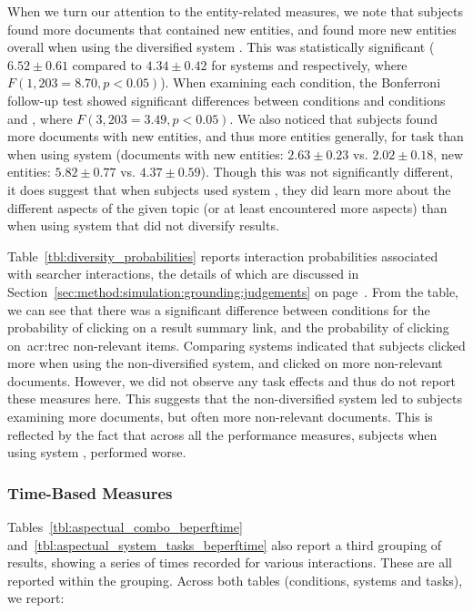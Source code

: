 When we turn our attention to the entity-related measures, we note that subjects found more documents that contained new entities, and found more new entities overall when using the diversified system . This was statistically significant ($6.52\pm0.61$ compared to $4.34\pm0.42$ for systems  and  respectively, where $F(1,203 = 8.70, p<0.05)$). When examining each condition, the Bonferroni follow-up test showed significant differences between conditions  and conditions  and , where $F(3,203 = 3.49, p < 0.05)$. We also noticed that subjects found more documents with new entities, and thus more entities generally, for task  than when using system  (documents with new entities: $2.63\pm0.23$ vs. $2.02\pm0.18$, new entities: $5.82\pm0.77$ vs. $4.37\pm0.59$). Though this was not significantly different, it does suggest that when subjects used system , they did learn more about the different aspects of the given topic (or at least encountered more aspects) than when using system  that did not diversify results.

Table~\ref{tbl:diversity_probabilities} reports interaction probabilities associated with searcher interactions, the details of which are discussed in Section~\ref{sec:method:simulation:grounding:judgements} on page~\pageref{sec:method:simulation:grounding:judgements}. From the table, we can see that there was a significant difference between conditions for the probability of clicking on a result summary link, and the probability of clicking on~\gls{acr:trec} non-relevant items. Comparing systems indicated that subjects clicked more when using the non-diversified system, and clicked on more non-relevant documents. However, we did not observe any task effects and thus do not report these measures here. This suggests that the non-diversified system  led to subjects examining more documents, but often more non-relevant documents. This is reflected by the fact that across all the performance measures, subjects when using system , performed worse.

\subsubsection{Time-Based Measures}
Tables~\ref{tbl:aspectual_combo_beperftime} and~\ref{tbl:aspectual_system_tasks_beperftime} also report a third grouping of results, showing a series of times recorded for various interactions. These are all reported within the  grouping. Across both tables (conditions, systems and tasks), we report:

